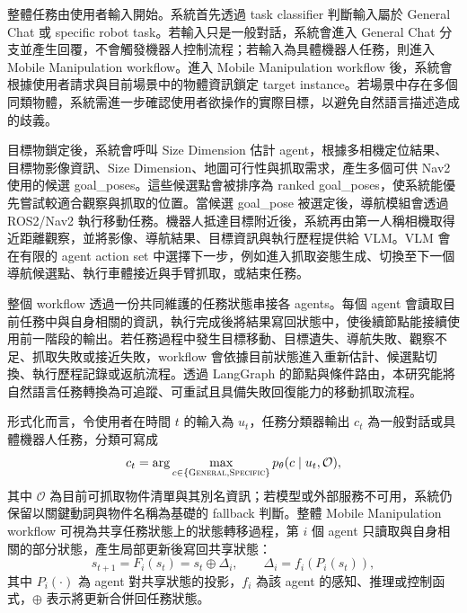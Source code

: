 \documentclass[12pt,a4paper]{article}
\begin{document}
整體任務由使用者輸入開始。系統首先透過 task classifier 判斷輸入屬於 General Chat 或 specific robot task。若輸入只是一般對話，系統會進入 General Chat 分支並產生回覆，不會觸發機器人控制流程；若輸入為具體機器人任務，則進入 Mobile Manipulation workflow。進入 Mobile Manipulation workflow 後，系統會根據使用者請求與目前場景中的物體資訊鎖定 target instance。若場景中存在多個同類物體，系統需進一步確認使用者欲操作的實際目標，以避免自然語言描述造成的歧義。

目標物鎖定後，系統會呼叫 Size Dimension 估計 agent，根據多相機定位結果、目標物影像資訊、Size Dimension、地圖可行性與抓取需求，產生多個可供 Nav2 使用的候選 goal\_poses。這些候選點會被排序為 ranked goal\_poses，使系統能優先嘗試較適合觀察與抓取的位置。當候選 goal\_pose 被選定後，導航模組會透過 ROS2/Nav2 執行移動任務。機器人抵達目標附近後，系統再由第一人稱相機取得近距離觀察，並將影像、導航結果、目標資訊與執行歷程提供給 VLM。VLM 會在有限的 agent action set 中選擇下一步，例如進入抓取姿態生成、切換至下一個導航候選點、執行車體接近與手臂抓取，或結束任務。

整個 workflow 透過一份共同維護的任務狀態串接各 agents。每個 agent 會讀取目前任務中與自身相關的資訊，執行完成後將結果寫回狀態中，使後續節點能接續使用前一階段的輸出。若任務過程中發生目標移動、目標遺失、導航失敗、觀察不足、抓取失敗或接近失敗，workflow 會依據目前狀態進入重新估計、候選點切換、執行歷程記錄或返航流程。透過 LangGraph 的節點與條件路由，本研究能將自然語言任務轉換為可追蹤、可重試且具備失敗回復能力的移動抓取流程。

形式化而言，令使用者在時間 $t$ 的輸入為 $u_t$，任務分類器輸出 $c_t$ 為一般對話或具體機器人任務，分類可寫成
\begin{equation}
    c_t=\arg\max_{c\in\{\textsc{General},\textsc{Specific}\}}p_\theta(c\mid u_t,\mathcal{O}),
\end{equation}
其中 $\mathcal{O}$ 為目前可抓取物件清單與其別名資訊；若模型或外部服務不可用，系統仍保留以關鍵動詞與物件名稱為基礎的 fallback 判斷。整體 Mobile Manipulation workflow 可視為共享任務狀態上的狀態轉移過程，第 $i$ 個 agent 只讀取與自身相關的部分狀態，產生局部更新後寫回共享狀態：
\begin{equation}
    s_{t+1}=F_i(s_t)=s_t\oplus \Delta_i, \qquad \Delta_i=f_i(P_i(s_t)),
\end{equation}
其中 $P_i(\cdot)$ 為 agent 對共享狀態的投影，$f_i$ 為該 agent 的感知、推理或控制函式，$\oplus$ 表示將更新合併回任務狀態。
\end{document}
